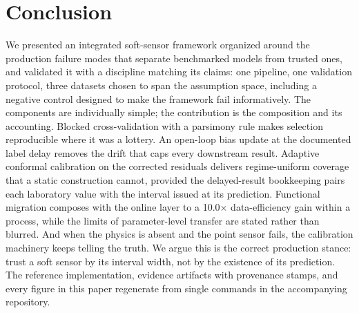 \section{Conclusion}
\label{sec:conclusion}

We presented an integrated soft-sensor framework organized around the production
failure modes that separate benchmarked models from trusted ones, and validated it
with a discipline matching its claims: one pipeline, one validation protocol, three
datasets chosen to span the assumption space, including a negative control designed
to make the framework fail informatively. The components are individually simple; the
contribution is the composition and its accounting. Blocked cross-validation with a
parsimony rule makes selection reproducible where it was a lottery. An open-loop bias
update at the documented label delay removes the drift that caps every downstream
result. Adaptive conformal calibration on the corrected residuals delivers
regime-uniform coverage that a static construction cannot, provided the delayed-result bookkeeping pairs each laboratory value with the interval issued at its prediction. Functional
migration composes with the online layer to a 10.0$\times$ data-efficiency gain within a
process, while the limits of parameter-level transfer are stated rather than blurred.
And when the physics is absent and the point sensor fails, the calibration machinery
keeps telling the truth. We argue this is the correct production stance: trust a
soft sensor by its interval width, not by the existence of its prediction. The
reference implementation, evidence artifacts with provenance stamps, and every figure
in this paper regenerate from single commands in the accompanying repository.
